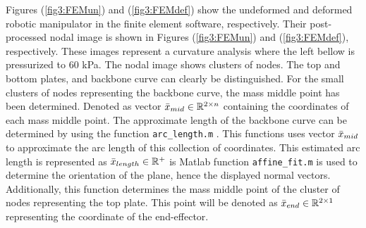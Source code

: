 Figures (\ref{fig3:FEMun}) and (\ref{fig3:FEMdef}) show the undeformed and deformed robotic manipulator in the finite element software, respectively. Their post-processed nodal image is shown in  Figures (\ref{fig3:FEMun}) and (\ref{fig3:FEMdef}), respectively. These images represent a curvature analysis where the left bellow is pressurized to 60 kPa. The nodal image shows clusters of nodes. The top and bottom plates, and backbone curve can clearly be distinguished. For the small clusters of nodes representing the backbone curve, the mass middle point has been determined. Denoted as
vector  $\Bar{x}_{mid} \in \mathbb{R}^{2\times n}$ containing the coordinates of each mass middle point. The approximate length of the backbone curve can be determined by using the function \verb+arc_length.m+ \cite{arclength}. This functions uses vector $\Bar{x}_{mid}$  to approximate the arc length of this collection of coordinates. This estimated arc length is represented as  $\Bar{x}_{length} \in \mathbb{R}^+ $ is Matlab function \verb+affine_fit.m+ \cite{affinefit} is used to determine the orientation of the plane, hence the displayed normal vectors. Additionally, this function determines the mass middle point of the cluster of nodes representing the top plate. This point will be denoted as $\Bar{x}_{end} \in \mathbb{R}^{2\times 1}$representing the coordinate of the end-effector.

